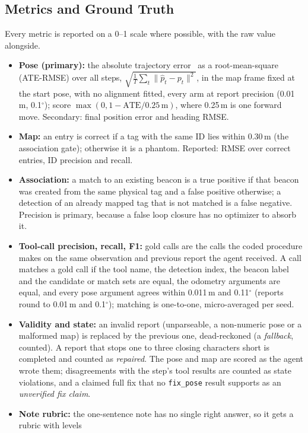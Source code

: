 \documentclass[conference]{IEEEtran}
\begin{document}
\subsection{Metrics and Ground Truth}\label{sec:metrics}
Every metric is reported on a 0--1 scale where possible, with the raw value alongside.
\begin{itemize}
\item \textbf{Pose (primary):} the absolute trajectory error~\cite{sturm2012benchmark} as a root-mean-square
(ATE-RMSE) over all steps,
$\sqrt{\tfrac{1}{T}\sum_t\lVert\hat p_t-p_t\rVert^2}$, in the map frame fixed at the start pose, with no
alignment fitted, every arm at report precision (0.01\,m, 0.1$^\circ$); score
$\max(0,1-\mathrm{ATE}/0.25\,\mathrm{m})$, where 0.25\,m is one forward move. Secondary: final position error
and heading RMSE.
\item \textbf{Map:} an entry is correct if a tag with the same ID lies within 0.30\,m (the association gate);
otherwise it is a phantom. Reported: RMSE over correct entries, ID precision and recall.
\item \textbf{Association:} a match to an existing beacon is a true positive if that beacon was created from
the same physical tag and a false positive otherwise; a detection of an already mapped tag that is not matched
is a false negative. Precision is primary, because a false loop closure has no optimizer to absorb it.
\item \textbf{Tool-call precision, recall, F1:} gold calls are the calls the coded procedure makes on the same
observation and previous report the agent received. A call matches a gold call if the tool name, the
detection index, the beacon label and the candidate or match sets are equal, the odometry arguments are equal, and
every pose argument agrees within 0.011\,m and 0.11$^\circ$ (reports round to 0.01\,m and 0.1$^\circ$);
matching is one-to-one, micro-averaged per seed.
\item \textbf{Validity and state:} an invalid report (unparseable, a non-numeric pose or a malformed map) is
replaced by the previous one, dead-reckoned (a \emph{fallback}, counted). A report
that stops one to three closing characters short is completed and counted as \emph{repaired}. The pose and
map are scored as the agent wrote them; disagreements with the step's tool results are counted as state
violations, and a claimed full fix that no \texttt{fix\_pose} result supports as an \emph{unverified fix claim}.
\item \textbf{Note rubric:} the one-sentence note has no single right answer, so it gets a rubric with levels

\end{itemize}
\end{document}
